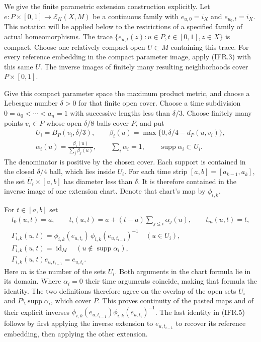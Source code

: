 \documentclass[11pt,a4paper]{article}
\DeclareMathOperator{\id}{id}\DeclareMathOperator{\im}{im}
\begin{document}
We give the finite parametric extension construction explicitly.
Let $e:P\times[0,1]\to\mathcal E_K(X,M)$ be a continuous family with
$e_{u,0}=i_X$ and $e_{u_0,t}=i_X$. This notation will be applied below
to the restrictions of a specified family of actual homeomorphisms.
The trace $\{e_{u,t}(z):u\in P,t\in[0,1],z\in X\}$ is compact.
Choose one relatively compact open $U\subset M$ containing this trace.
For every reference embedding in the compact parameter image, apply
(IFR.3) with this same $U$. The inverse images of finitely many resulting
neighborhoods cover $P\times[0,1]$.

Give this compact parameter space the maximum product metric, and
choose a Lebesgue number $\delta>0$ for that finite open cover.
Choose a time subdivision $0=a_0<\cdots<a_n=1$ with successive
lengths less than $\delta/3$. Choose finitely many points $v_i\in P$
whose open $\delta/8$ balls cover $P$, and put
\[
\begin{gathered}
 U_i=B_P(v_i,\delta/3),\qquad
 \beta_i(u)=\max\{0,\delta/4-d_P(u,v_i)\},\\
 \alpha_i(u)=\frac{\beta_i(u)}{\sum_j\beta_j(u)},\qquad
 \sum_i\alpha_i=1,\qquad \operatorname{supp}\alpha_i\subset U_i.
\end{gathered}                                                    \tag{IFR.4}
\]
The denominator is positive by the chosen cover. Each support is
contained in the closed $\delta/4$ ball, which lies inside $U_i$.
For each time strip $[a,b]=[a_{k-1},a_k]$, the set
$\overline U_i\times[a,b]$ has diameter less than $\delta$.
It is therefore contained in the inverse image of one extension chart.
Denote that chart's map by $\phi_{i,k}$.

For $t\in[a,b]$ set
\[
\begin{gathered}
 t_0(u,t)=a,\qquad
 t_i(u,t)=a+(t-a)\sum_{j\leq i}\alpha_j(u),\qquad t_m(u,t)=t,\\
 \Gamma_{i,k}(u,t)=
 \phi_{i,k}(e_{u,t_i})\,
               \phi_{i,k}(e_{u,t_{i-1}})^{-1}\quad(u\in U_i),\\
 \Gamma_{i,k}(u,t)=\id_M\quad(u\notin\operatorname{supp}\alpha_i),\\
 \Gamma_{i,k}(u,t)e_{u,t_{i-1}}=e_{u,t_i}.
\end{gathered}                                                    \tag{IFR.5}
\]
Here $m$ is the number of the sets $U_i$. Both arguments in the chart
formula lie in its domain. Where $\alpha_i=0$ their time arguments
coincide, making that formula the identity. The two definitions therefore
agree on the overlap of the open sets $U_i$ and
$P\setminus\operatorname{supp}\alpha_i$, which cover $P$.
This proves continuity of the pasted maps and of their explicit inverses
$\phi_{i,k}(e_{u,t_{i-1}})\phi_{i,k}(e_{u,t_i})^{-1}$.
The last identity in (IFR.5) follows by first applying the inverse
extension to $e_{u,t_{i-1}}$ to recover its reference embedding,
then applying the other extension.
\end{document}

